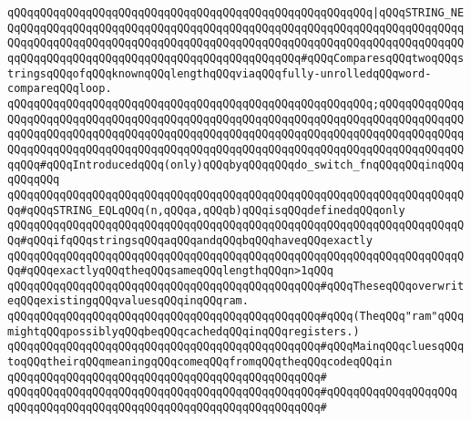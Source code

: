 \verb|qQQqqQQqqQQqqQQqqQQqqQQqqQQqqQQqqQQqqQQqqQQqqQQqqQQqqQQq|\verb#|qQQqSTRING_NEQqQQqqQQqqQQqqQQqqQQqqQQqqQQqqQQqqQQqqQQqqQQqqQQqqQQqqQQqqQQqqQQqqQQqqQQqqQQqqQQqqQQqqQQqqQQqqQQqqQQqqQQqqQQqqQQqqQQqqQQqqQQqqQQqqQQqqQQqqQQqqQQqqQQqqQQqqQQqqQQqqQQqqQQqqQQqqQQqqQQqqQQq#\verb|#qQQqComparesqQQqtwoqQQqstringsqQQqofqQQqknownqQQqlengthqQQqviaqQQqfully-unrolledqQQqword-compareqQQqloop.|\newline
\verb|qQQqqQQqqQQqqQQqqQQqqQQqqQQqqQQqqQQqqQQqqQQqqQQqqQQqqQQq;qQQqqQQqqQQqqQQqqQQqqQQqqQQqqQQqqQQqqQQqqQQqqQQqqQQqqQQqqQQqqQQqqQQqqQQqqQQqqQQqqQQqqQQqqQQqqQQqqQQqqQQqqQQqqQQqqQQqqQQqqQQqqQQqqQQqqQQqqQQqqQQqqQQqqQQqqQQqqQQqqQQqqQQqqQQqqQQqqQQqqQQqqQQqqQQqqQQqqQQqqQQqqQQqqQQqqQQqqQQqqQQqqQQq#qQQqIntroducedqQQq(only)qQQqbyqQQqqQQqdo_switch_fnqQQqqQQqinqQQqqQQqqQQq|\newline
\verb|qQQqqQQqqQQqqQQqqQQqqQQqqQQqqQQqqQQqqQQqqQQqqQQqqQQqqQQqqQQqqQQqqQQqqQQq#qQQqSTRING_EQLqQQq(n,qQQqa,qQQqb)qQQqisqQQqdefinedqQQqonly|\newline
\verb|qQQqqQQqqQQqqQQqqQQqqQQqqQQqqQQqqQQqqQQqqQQqqQQqqQQqqQQqqQQqqQQqqQQqqQQq#qQQqifqQQqstringsqQQqaqQQqandqQQqbqQQqhaveqQQqexactly|\newline
\verb|qQQqqQQqqQQqqQQqqQQqqQQqqQQqqQQqqQQqqQQqqQQqqQQqqQQqqQQqqQQqqQQqqQQqqQQq#qQQqexactlyqQQqtheqQQqsameqQQqlengthqQQqn>1qQQq|\newline
\newline
\verb|qQQqqQQqqQQqqQQqqQQqqQQqqQQqqQQqqQQqqQQqqQQqqQQq#qQQqTheseqQQqoverwriteqQQqexistingqQQqvaluesqQQqinqQQqram.|\newline
\verb|qQQqqQQqqQQqqQQqqQQqqQQqqQQqqQQqqQQqqQQqqQQqqQQq#qQQq(TheqQQq"ram"qQQqmightqQQqpossiblyqQQqbeqQQqcachedqQQqinqQQqregisters.)|\newline
\verb|qQQqqQQqqQQqqQQqqQQqqQQqqQQqqQQqqQQqqQQqqQQqqQQq#qQQqMainqQQqcluesqQQqtoqQQqtheirqQQqmeaningqQQqcomeqQQqfromqQQqtheqQQqcodeqQQqin|\newline
\verb|qQQqqQQqqQQqqQQqqQQqqQQqqQQqqQQqqQQqqQQqqQQqqQQq#|\newline
\verb|qQQqqQQqqQQqqQQqqQQqqQQqqQQqqQQqqQQqqQQqqQQqqQQq#qQQqqQQqqQQqqQQqqQQq|\newline
\verb|qQQqqQQqqQQqqQQqqQQqqQQqqQQqqQQqqQQqqQQqqQQqqQQq#|\newline
